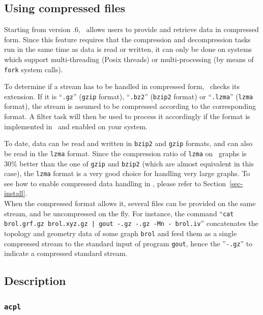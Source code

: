 \subsection{Using compressed files}
\label{sec-prog-compressed}

Starting from version {.6}, \scotch\ allows users to provide
and retrieve data in compressed form. Since this feature requires that
the compression and decompression tasks run in the same time as data
is read or written, it can only be done on systems which support
multi-threading (Posix threads) or multi-processing (by means of
\texttt{fork} system calls).

To determine if a stream has to be handled in compressed form,
\scotch\ checks its extension. If it is ``\texttt{.gz}'' (\texttt{gzip}
format), ``\texttt{.bz2}'' (\texttt{bzip2} format) or ``\texttt{.lzma}''
(\texttt{lzma} format), the stream is assumed to be compressed according
to the corresponding format. A filter task will then be used to process
it accordingly if the format is implemented in \scotch\ and enabled on
your system.

To date, data can be read and written in \texttt{bzip2} and \texttt{gzip}
formats, and can also be read in the \texttt{lzma} format. Since the
compression ratio of \texttt{lzma} on \scotch\ graphs is $30\%$ better
than the one of \texttt{gzip} and \texttt{bzip2} (which are almost
equivalent in this case), the \texttt{lzma} format is a very good choice
for handling very large graphs. To see how to enable compressed data
handling in \scotch, please refer to Section~\ref{sec-install}.
\\

When the compressed format allows it, several files can be provided on
the same stream, and be uncompressed on the fly. For instance, the
command ``\texttt{cat brol.grf.gz brol.xyz.gz | gout -.gz -.gz -Mn -
brol.iv}'' concatenates the topology and geometry data of some graph
\texttt{brol} and feed them as a single compressed stream to the standard
input of program \texttt{gout}, hence the ''\texttt{-.gz}'' to indicate a
compressed standard stream.

\subsection{Description}

\subsubsection{\texttt{acpl}}

